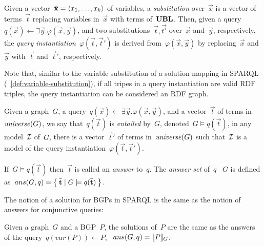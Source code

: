 \begin{definition}
Given a vector~$\bar{\mathbf x} = \langle x_1, \dots, x_k \rangle$ of variables, a \emph{substitution} over~$\vec{x}$ is a vector of terms~$\vec{t}$ replacing variables in~$\vec{x}$ with terms of~$\mathbf{UBL}$. Then,
given a query~$q(\vec{x}) \leftarrow \exists \vec{y}.\varphi(\vec{x},\vec{y})$, and two substitutions~$\vec{t},
  \vec{t'}$ over~$\vec{x}$ and~$\vec{y}$, respectively, the \emph{query instantiation}~$\varphi(\vec{t}, \vec{t}')$ is derived from~$\varphi(\vec{x},
  \vec{y})$ by replacing~$\vec{x}$ and~$\vec{y}$ with~$\vec{t}$ and~$\vec{t}'$, respectively.
\end{definition}

\nd Note that, similar to the variable substitution of a solution mapping in SPARQL
(\cf~\cref{def:variable-substitution}), if all tripes in a query instantiation are valid \ac{RDF} triples, the
query instantiation can be considered an RDF graph.

\begin{definition}[Entailment]
  \label{def:entailment}
  Given a graph~$G$, a query~$q(\vec{x}) \leftarrow \exists \vec{y}.\varphi(\vec{x},\vec{y})$, and a vector~$\vec{t}$ of
  terms in~$\mathit{universe}(G)$, we say that~$q(\vec{t})$ is \emph{entailed} by~$G$, denoted~$G \models q(\vec{t})$, \iff in
  any model~$\mathcal{I}$ of~$G$, there is a vector~$\vec{t}'$ of terms in~$\mathit{universe}(G)$ such that~$\mathcal{I}$ is a model of the query
  instantiation~$\varphi(\vec{t}, \vec{t}')$.
\end{definition}

\begin{definition}
  If~$G \models q(\vec{t})$ then~$\vec{t}$ is called an \emph{answer} to~$q$. The \emph{answer set} of~$q$ \wrt~$G$ is
  defined as~$ans(G,q) = \left\{\: \bar{\mathbf t} \mid G \models q(\bar{\mathbf t}) \:\right\}$.
\end{definition}
%
\noindent The notion of a solution for \acp{BGP} in SPARQL is the same as the notion of answers for conjunctive queries:
%
\begin{proposition} 
  \label{pp}
  Given a graph~$G$ and a \ac{BGP}~$P$, the solutions of~$P$ are the same as the answers of the query~$q(var(P))
  \leftarrow P$, \ie~$ans(G,q) = [\![ P ]\!]_{G}$.
\end{proposition}



